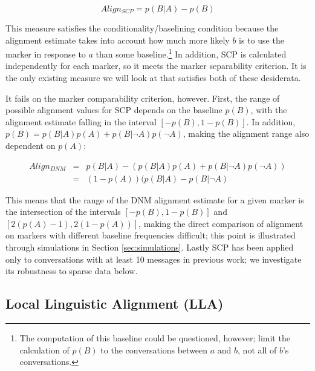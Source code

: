\documentclass{acm_proc_article-sp}
\begin{document}
\begin{equation}
Align_{SCP} = p(B|A) - p(B)
\end{equation}

This measure satisfies the conditionality/baselining condition because the alignment estimate takes into account how much more likely $b$ is to use the marker in response to $a$ than some baseline.\footnote{The computation of this baseline could be questioned, however; \cite{DNMGamonDumais2011} limit the calculation of $p(B)$ to the conversations between $a$ and $b$, not all of $b$'s conversations.}  In addition, SCP is calculated independently for each marker, so it meets the marker separability criterion.  It is the only existing measure we will look at that satisfies both of these desiderata.

It fails on the marker comparability criterion, however.  First, the range of possible alignment values for SCP depends on the baseline $p(B)$, with the alignment estimate falling in the interval $[-p(B),1-p(B)]$.  In addition, $p(B) = p(B|A)p(A) + p(B|\neg A)p(\neg A)$, making the alignment range also dependent on $p(A)$:

\begin{align*}
Align_{DNM} & = & p(B|A) - (p(B|A)p(A) + p(B|\neg A)p(\neg A)) \\
& = & (1-p(A))(p(B|A) - p(B|\neg A)
\end{align*} 

This means that the range of the DNM alignment estimate for a given marker is the intersection of the intervals $[-p(B), 1-p(B)]$ and $[2(p(A)-1), 2(1-p(A))]$, making the direct comparison of alignment on markers with different baseline frequencies difficult; this point is illustrated through simulations in Section \ref{sec:simulations}.  Lastly SCP has been applied only to conversations with at least 10 messages in previous work; we investigate its robustness to sparse data below.

\subsection{Local Linguistic Alignment (LLA)} 
\end{document}
